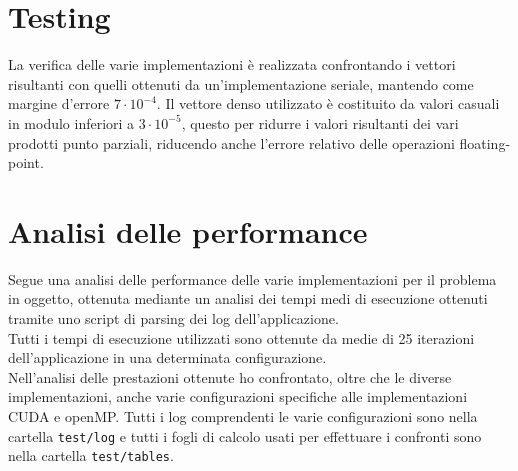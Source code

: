 \documentclass[acmsmall,nonacm=true]{acmart}
\newcommand{\vvv}[1]{{\small\texttt{#1}}}
\begin{document}
\section{Testing}
La verifica delle varie implementazioni è realizzata confrontando i vettori
risultanti con quelli ottenuti da un'implementazione seriale, mantendo come
\label{fpOpErrorMargin} %
margine d'errore $7 \cdot 10^{-4}$. 
Il vettore denso utilizzato è costituito da valori casuali in modulo inferiori
a $3 \cdot 10^{-5}$, questo per ridurre i valori risultanti dei vari prodotti
punto parziali, riducendo anche l'errore relativo delle operazioni floating-point.\\
\section{Analisi delle performance}
Segue una analisi delle performance delle varie implementazioni per il problema 
in oggetto, ottenuta mediante un analisi dei tempi medi di esecuzione
ottenuti tramite uno script di parsing dei log dell'applicazione.\\
Tutti i tempi di esecuzione utilizzati sono ottenute da medie di 25 iterazioni
dell'applicazione in una determinata configurazione.\\

Nell'analisi delle prestazioni ottenute ho confrontato, oltre che le diverse implementazioni, 
anche varie configurazioni specifiche alle implementazioni CUDA e openMP.
Tutti i log comprendenti le varie configurazioni sono nella cartella \vvv{test/log} e 
tutti i fogli di calcolo usati per effettuare i confronti sono nella cartella \vvv{test/tables}.\\
\end{document}
